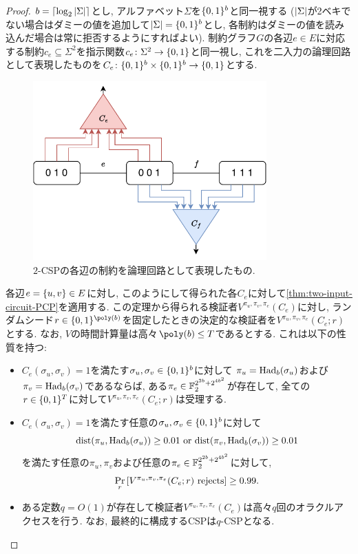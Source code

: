 \begin{proof}
  $b = \lceil\log_2\abs{\Sigma}\rceil$とし, アルファベット$\Sigma$を$\{0,1\}^b$と同一視する
  ($\abs{\Sigma}$が2ベキでない場合はダミーの値を追加して$\abs{\Sigma}=\{0,1\}^b$とし, 各制約はダミーの値を読み込んだ場合は常に拒否するようにすればよい).
  制約グラフ$G$の各辺$e\in E$に対応する制約$c_e\subseteq \Sigma^2$を指示関数$c_e\colon\Sigma^2\to\{0,1\}$と同一視し, これを二入力の論理回路として表現したものを$C_e\colon \{0,1\}^b\times \{0,1\}^b\to \{0,1\}$とする.

  \begin{figure}[ht]
    \centering
    \includegraphics[width=0.8\textwidth]{images/newCSP.pdf}
    \caption{$2$-CSPの各辺の制約を論理回路として表現したもの. \label{fig:newCSP}}
  \end{figure}

  各辺$e=\qty{u,v}\in E$に対し, このようにして得られた各$C_e$に対して\cref{thm:two-input-circuit-PCP}を適用する.
  この定理から得られる検証者$V^{\pi_u,\pi_v,\pi_e}(C_e)$に対し,
  ランダムシード$r\in\binset^{\poly(b)}$を固定したときの決定的な検証者を$V^{\pi_u,\pi_v,\pi_e}(C_e;r)$とする. なお, $V$の時間計算量は高々$\poly(b)\le T$であるとする.
  これは以下の性質を持つ:
  \begin{itemize}
    \item $C_e(\sigma_u,\sigma_v)=1$を満たす$\sigma_u,\sigma_v\in\{0,1\}^b$に対して $\pi_u=\mathrm{Had}_b(\sigma_u)$および$\pi_v=\mathrm{Had}_b(\sigma_v)$であるならば, ある$\pi_e\in \mathbb{F}_2^{2^{2b} + 2^{4b^2}}$が存在して, 全ての$r\in\{0,1\}^T$に対して$V^{\pi_u,\pi_v,\pi_e}(C_e;r)$は受理する.
    \item $C_e(\sigma_u,\sigma_v)=1$を満たす任意の$\sigma_u,\sigma_v\in\{0,1\}^b$に対して
    \[\mathrm{dist}(\pi_u,\mathrm{Had}_b(\sigma_u))\ge0.01 \text{ or }\mathrm{dist}(\pi_v,\mathrm{Had}_b(\sigma_v))\ge0.01\]
    を満たす任意の$\pi_u,\pi_v$および任意の$\pi_e \in \mathbb{F}_2^{2^{2b} + 2^{4b^2}}$に対して, \[\Pr_r\qty[V^{\pi_u,\pi_v,\pi_e}(C_e;r)\text{ rejects}]\ge 0.99.\]
    \item ある定数$q=O(1)$が存在して検証者$V^{\pi_u,\pi_v,\pi_e}(C_e)$は高々$q$回のオラクルアクセスを行う. なお, 最終的に構成するCSPは$q$-CSPとなる.
  \end{itemize}
  

\end{proof}
